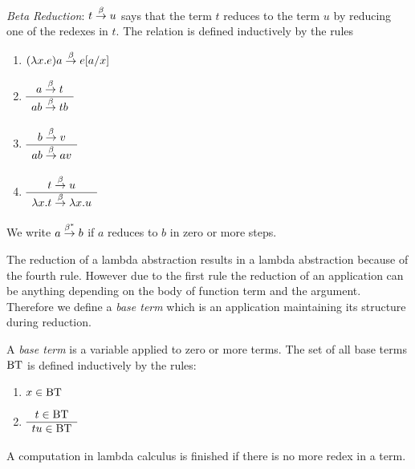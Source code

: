 \documentclass[12pt]{article}
\begin{document}
\begin{definition}
    \emph{Beta Reduction}:
    \label{def-beta-reduction}
    $t \stackrel{\beta}\to u$ says that the term $t$ reduces to the
    term $u$ by reducing one of the redexes in $t$. The relation is defined
    inductively by the rules
    \begin{enumerate}
        \item $(\lambda x. e) a \stackrel{\beta}\to e[a/x]$

        \item $\begin{array}{c} a \stackrel{\beta}\to t  \\ \hline a b \stackrel{\beta}\to t b \end{array}$

        \item $\begin{array}{c} b \stackrel{\beta}\to v  \\ \hline a b \stackrel{\beta}\to a v \end{array}$

        \item $\begin{array}{c} t \stackrel{\beta}\to u \\ \hline \lambda x. t \stackrel{\beta}\to \lambda x.u \end{array}$
    \end{enumerate}
    We write $a \stackrel{\beta^*}\to b$ if $a$ reduces to $b$ in zero or more steps.
\end{definition}


The reduction of a lambda abstraction results in a lambda abstraction because of
the fourth rule. However due to the first rule the reduction of an application
can be anything depending on the body of function term and the argument.
Therefore we define a \emph{base term} which is an application maintaining
its structure during reduction.


\begin{definition}
    A \emph{base term}
    is a variable applied to zero or more terms. The
    set of all base terms $\text{BT}$ is defined inductively by the rules:
    \begin{enumerate}
        \item $x \in \text{BT}$

        \item $
            \begin{array}{c} 
                t \in \text{BT}
             \\ \hline 
                t u \in \text{BT}
             \end{array}
    $
    \end{enumerate}
\end{definition}




A computation in lambda calculus is finished if there is no more redex in a
term.
\end{document}
